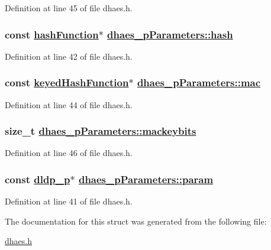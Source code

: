 Definition at line 45 of file dhaes.h.\hypertarget{structdhaes__pParameters_o1}{
\subsubsection[hash]{\setlength{\rightskip}{0pt plus 5cm}const \hyperlink{structhashFunction}{hash\-Function}$\ast$ \hyperlink{structdhaes__pParameters_o1}{dhaes\_\-p\-Parameters::hash}}}
\label{structdhaes__pParameters_o1}


Definition at line 42 of file dhaes.h.\hypertarget{structdhaes__pParameters_o3}{
\subsubsection[mac]{\setlength{\rightskip}{0pt plus 5cm}const \hyperlink{structkeyedHashFunction}{keyed\-Hash\-Function}$\ast$ \hyperlink{structdhaes__pParameters_o3}{dhaes\_\-p\-Parameters::mac}}}
\label{structdhaes__pParameters_o3}


Definition at line 44 of file dhaes.h.\hypertarget{structdhaes__pParameters_o5}{
\subsubsection[mackeybits]{\setlength{\rightskip}{0pt plus 5cm}size\_\-t \hyperlink{structdhaes__pParameters_o5}{dhaes\_\-p\-Parameters::mackeybits}}}
\label{structdhaes__pParameters_o5}


Definition at line 46 of file dhaes.h.\hypertarget{structdhaes__pParameters_o0}{
\subsubsection[param]{\setlength{\rightskip}{0pt plus 5cm}const \hyperlink{structdldp__p}{dldp\_\-p}$\ast$ \hyperlink{structdhaes__pParameters_o0}{dhaes\_\-p\-Parameters::param}}}
\label{structdhaes__pParameters_o0}


Definition at line 41 of file dhaes.h.

The documentation for this struct was generated from the following file:\begin{CompactItemize}
\item 
\hyperlink{dhaes_8h}{dhaes.h}\end{CompactItemize}
